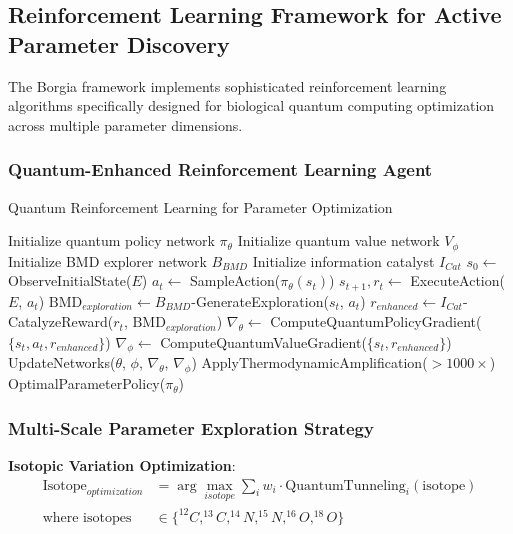 ﻿\documentclass[11pt,a4paper]{article}
\begin{document}
\subsection{Reinforcement Learning Framework for Active Parameter Discovery}

The Borgia framework implements sophisticated reinforcement learning algorithms specifically designed for biological quantum computing optimization across multiple parameter dimensions.

\subsubsection{Quantum-Enhanced Reinforcement Learning Agent}

\begin{algorithm}
\caption{Quantum Reinforcement Learning for Parameter Optimization}
\begin{algorithmic}
    \State Initialize quantum policy network $\pi_{\theta}$
    \State Initialize quantum value network $V_{\phi}$
    \State Initialize BMD explorer network $B_{BMD}$
    \State Initialize information catalyst $I_{Cat}$
        \State $s_0 \leftarrow$ ObserveInitialState($E$)
            \State $a_t \leftarrow$ SampleAction($\pi_{\theta}(s_t)$)
            \State $s_{t+1}, r_t \leftarrow$ ExecuteAction($E$, $a_t$)
            \State $\text{BMD}_{exploration} \leftarrow B_{BMD}$-GenerateExploration($s_t$, $a_t$)
            \State $r_{enhanced} \leftarrow I_{Cat}$-CatalyzeReward($r_t$, $\text{BMD}_{exploration}$)
        \EndFor
        \State $\nabla_{\theta} \leftarrow$ ComputeQuantumPolicyGradient($\{s_t, a_t, r_{enhanced}\}$)
        \State $\nabla_{\phi} \leftarrow$ ComputeQuantumValueGradient($\{s_t, r_{enhanced}\}$)
        \State UpdateNetworks($\theta$, $\phi$, $\nabla_{\theta}$, $\nabla_{\phi}$)
        \State ApplyThermodynamicAmplification($>1000 \times$)
    \EndFor
    \State \Return OptimalParameterPolicy($\pi_{\theta}$)
\EndProcedure
\end{algorithmic}
\end{algorithm}

\subsubsection{Multi-Scale Parameter Exploration Strategy}

\textbf{Isotopic Variation Optimization}:
\begin{align}
\text{Isotope}_{optimization} &= \arg\max_{isotope} \sum_{i} w_i \cdot \text{QuantumTunneling}_i(\text{isotope}) \\
\text{where isotopes} &\in \{^{12}C, ^{13}C, ^{14}N, ^{15}N, ^{16}O, ^{18}O\}
\end{align}
\end{document}
